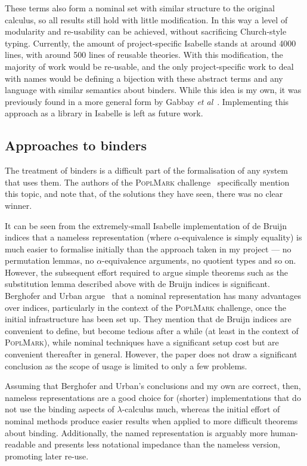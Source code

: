 These terms also form a nominal set with similar structure to the original calculus, so all results still hold with little modification.
In this way a level of modularity and re-usability can be achieved, without sacrificing Church-style typing.
Currently, the amount of project-specific Isabelle stands at around 4000 lines, with around 500 lines of reusable theories.
With this modification, the majority of work would be re-usable, and the only project-specific work to deal with names would be defining a bijection with these abstract terms and any language with similar semantics about binders.
While this idea is my own, it was previously found in a more general form by Gabbay \emph{et al}~\cite{nominal-algebra}.
Implementing this approach as a library in Isabelle is left as future work.

\subsection{Approaches to binders}
The treatment of binders is a difficult part of the formalisation of any system that uses them.
The authors of the \textsc{PoplMark} challenge~\cite{poplmark} specifically mention this topic, and note that, of the solutions they have seen, there was no clear winner.

It can be seen from the extremely-small Isabelle implementation of de Bruijn indices that a nameless representation (where \(\alpha\)-equivalence is simply equality) is much easier to formalise initially than the approach taken in my project --- no permutation lemmas, no \(\alpha\)-equivalence arguments, no quotient types and so on.
However, the subsequent effort required to argue simple theorems such as the substitution lemma described above with de Bruijn indices is significant.
Berghofer and Urban argue~\cite{head-to-head} that a nominal representation has many advantages over indices, particularly in the context of the \textsc{PoplMark} challenge, once the initial infrastructure has been set up.
They mention that de Bruijn indices are convenient to define, but become tedious after a while (at least in the context of \textsc{PoplMark}), while nominal techniques have a significant setup cost but are convenient thereafter in general.
However, the paper does not draw a significant conclusion as the scope of usage is limited to only a few problems.

Assuming that Berghofer and Urban's conclusions and my own are correct, then, nameless representations are a good choice for (shorter) implementations that do not use the binding aspects of \(\lambda\)-calculus much, whereas the initial effort of nominal methods produce easier results when applied to more difficult theorems about binding.
Additionally, the named representation is arguably more human-readable and presents less notational impedance than the nameless version, promoting later re-use.

